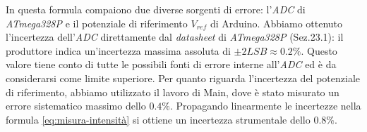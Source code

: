   In questa formula compaiono due diverse sorgenti di errore:
  l'\emph{ADC} di \emph{ATmega328P} e il potenziale di riferimento $V_{ref}$
  di Arduino.
  Abbiamo ottenuto l’incertezza dell’\emph{ADC} direttamente dal
  \emph{datasheet}\cite{atmega} di \emph{ATmega328P} (Sez.23.1):
  il produttore indica un'incertezza massima assoluta di $\pm 2LSB \approx 0.2\%$.
  Questo valore tiene conto di tutte le possibili fonti di errore interne
  all’\emph{ADC} ed è da considerarsi come limite superiore.
  Per quanto riguarda l'incertezza del potenziale di riferimento, abbiamo
  utilizzato il lavoro di Main\cite{main}, dove è stato misurato un errore sistematico
  massimo dello $0.4\%$.
  Propagando linearmente le incertezze nella formula \eqref{eq:misura-intensità} si ottiene un incertezza
  strumentale dello $0.8\%$.

